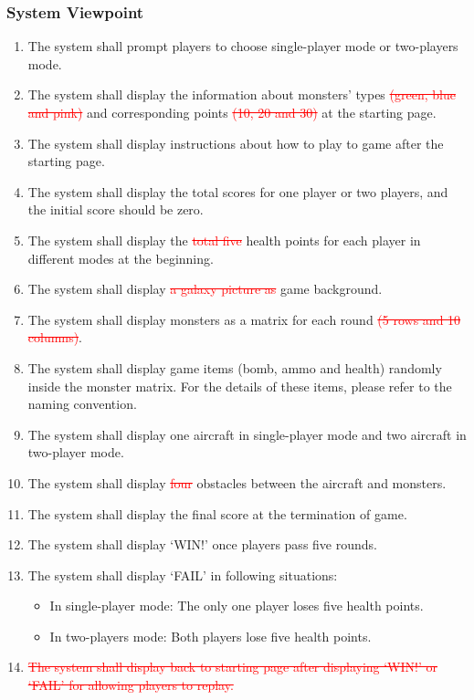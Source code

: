\documentclass[12pt]{article}
\begin{document}
\subsubsection{System Viewpoint}
\begin{enumerate}[{FR}1:] 
\item The system shall prompt players to choose single-player
mode or two-players mode.
\item The system shall display the information about monsters’
types \textcolor{red}{\st{ (green, blue and pink)}} and corresponding points \textcolor{red}{\st{(10, 20 and 30)}} at the starting page.
\item The system shall display instructions about how to 
play to game after the starting page.
\item The system shall display the total scores for one player
or two players, and the initial score should be zero.
\item The system shall display the \textcolor{red}{\st{total five}} health points for each player in different modes at the beginning.
\item The system shall display \textcolor{red}{\st{a galaxy picture as}} game background.
\item The system shall display monsters as a matrix for each round \textcolor{red}{\st{(5 rows and 10 columns)}}.
\item The system shall display game items (bomb, ammo and health) randomly inside the monster matrix. For the details of these items, please refer to the naming convention.
\item The system shall display one aircraft in single-player mode and two aircraft in two-player mode.
\item The system shall display \textcolor{red}{\st{four}} obstacles between the aircraft and monsters.
\item The system shall display the final score at the termination of game.
\item The system shall display ‘WIN!’ once players pass five rounds.
\item The system shall display ‘FAIL’ in following situations:
\begin{itemize}
\item In single-player mode: The only one player loses five health points.
\item In two-players mode: Both players lose five health points.
\end{itemize}
\item \textcolor{red}{\sout{ The system shall display back to starting page after displaying ‘WIN!’ or ‘FAIL’ for allowing players to replay.}}

\end{enumerate}
\end{document}
